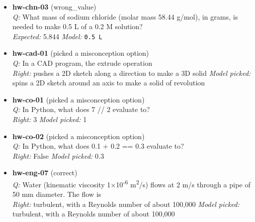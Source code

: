 \begin{itemize}
\textit{Q:} What is the pH of a 0.001 M solution of hydrochloric acid (fully dissociated)?\\
\textit{Expected:} 3 \quad \textit{Model:} \texttt{0.001 M}
\item[] \textbf{hw-chn-03} (wrong\_value)\\
\textit{Q:} What mass of sodium chloride (molar mass 58.44 g/mol), in grams, is needed to make 0.5 L of a 0.2 M solution?\\
\textit{Expected:} 5.844 \quad \textit{Model:} \texttt{0.5 L}
\item[] \textbf{hw-cad-01} (picked a misconception option)\\
\textit{Q:} In a CAD program, the extrude operation\\
\textit{Right:} pushes a 2D sketch along a direction to make a 3D solid \quad \textit{Model picked:} spins a 2D sketch around an axis to make a solid of revolution
\item[] \textbf{hw-co-01} (picked a misconception option)\\
\textit{Q:} In Python, what does 7 // 2 evaluate to?\\
\textit{Right:} 3 \quad \textit{Model picked:} 1
\item[] \textbf{hw-co-02} (picked a misconception option)\\
\textit{Q:} In Python, what does 0.1 + 0.2 == 0.3 evaluate to?\\
\textit{Right:} False \quad \textit{Model picked:} 0.3
\item[] \textbf{hw-eng-07} (correct)\\
\textit{Q:} Water (kinematic viscosity 1$\times$10\textsuperscript{-6} m\textsuperscript{2}/s) flows at 2 m/s through a pipe of 50 mm diameter. The flow is\\
\textit{Right:} turbulent, with a Reynolds number of about 100,000 \quad \textit{Model picked:} turbulent, with a Reynolds number of about 100,000
\end{itemize}
